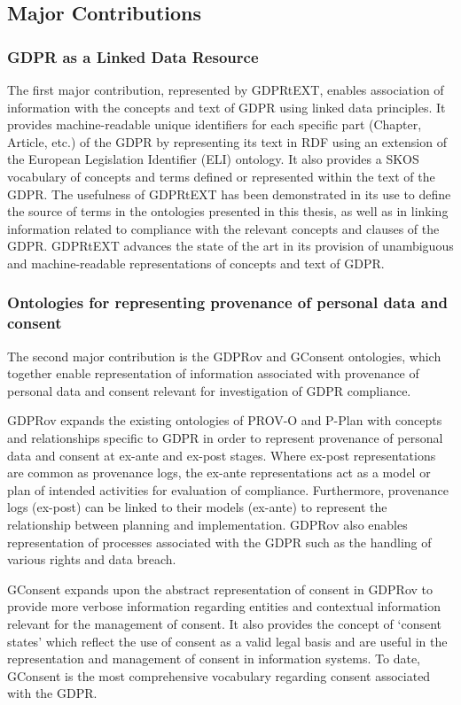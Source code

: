 \subsection*{Major Contributions}
\subsubsection{GDPR as a Linked Data Resource}
The first major contribution, represented by GDPRtEXT, enables association of information with the concepts and text of GDPR using linked data principles. It provides machine-readable unique identifiers for each specific part (Chapter, Article, etc.) of the GDPR by representing its text in RDF using an extension of the European Legislation Identifier (ELI) ontology. It also provides a SKOS vocabulary of concepts and terms defined or represented within the text of the GDPR. The usefulness of GDPRtEXT has been demonstrated in its use to define the source of terms in the ontologies presented in this thesis, as well as in linking information related to compliance with the relevant concepts and clauses of the GDPR. GDPRtEXT advances the state of the art in its provision of unambiguous and machine-readable representations of concepts and text of GDPR.

\subsubsection{Ontologies for representing provenance of personal data and consent}
The second major contribution is the GDPRov and GConsent ontologies, which together enable representation of information associated with provenance of personal data and consent relevant for investigation of GDPR compliance.

GDPRov expands the existing ontologies of PROV-O and P-Plan with concepts and relationships specific to GDPR in order to represent provenance of personal data and consent at ex-ante and ex-post stages. Where ex-post representations are common as provenance logs, the ex-ante representations act as a model or plan of intended activities for evaluation of compliance. Furthermore, provenance logs (ex-post) can be linked to their models (ex-ante) to represent the relationship between planning and implementation. GDPRov also enables representation of processes associated with the GDPR such as the handling of various rights and data breach.

GConsent expands upon the abstract representation of consent in GDPRov to provide more verbose information regarding entities and contextual information relevant for the management of consent. It also provides the concept of `consent states' which reflect the use of consent as a valid legal basis and are useful in the  representation and management of consent in information systems. To date, GConsent is the most comprehensive vocabulary regarding consent associated with the GDPR.

